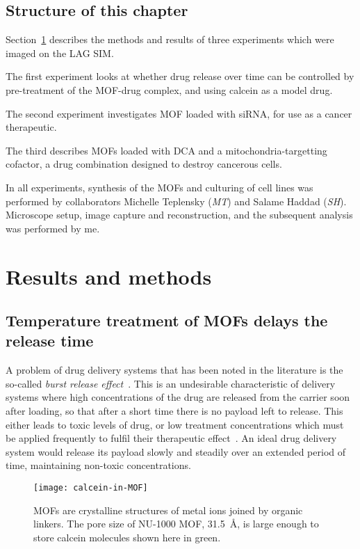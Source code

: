 \subsection{Structure of this chapter}
Section~\ref{sec:mofmethods} describes the methods and results of three experiments which were imaged on the LAG SIM. 

The first experiment looks at whether drug release over time can be controlled by pre-treatment of the MOF-drug complex, and using calcein as a model drug. 

The second experiment investigates MOF loaded with siRNA, for use as a cancer therapeutic.
 
The third describes MOFs loaded with DCA and a mitochondria-targetting cofactor, a drug combination designed to destroy cancerous cells. 

In all experiments, synthesis of the MOFs and culturing of cell lines was performed by collaborators Michelle Teplensky (\textit{MT}) and Salame Haddad (\textit{SH}). 
Microscope setup, image capture and reconstruction, and the subsequent analysis was performed by me. 

\section{Results and methods} \label{sec:mofmethods}

\subsection{Temperature treatment of MOFs delays the release time} \label{sec:mof-temperature}
A problem of drug delivery systems that has been noted in the literature is the so-called \textit{burst release effect}~\cite{huang2001importance}.
This is an undesirable characteristic of delivery systems where high concentrations of the drug are released from the carrier soon after loading, so that after a short time there is no payload left to release. 
This either leads to toxic levels of drug, or low treatment concentrations which must be applied frequently to fulfil their therapeutic effect~\cite{fu2010drug}. 
An ideal drug delivery system would release its payload slowly and steadily over an extended period of time, maintaining non-toxic concentrations. 

\begin{figure}[htbp!]
\centering
\texttt{[image: calcein-in-MOF]}
\caption[MOFs: The NU-1000 MOF has a large pore size to store other molecules]{MOFs are crystalline structures of metal ions joined by organic linkers. The pore size of NU-1000 MOF, \SI{31.5}{\angstrom}, is large enough to store calcein molecules shown here in green.}
\label{fig:calcein-in-MOF}
\end{figure}

